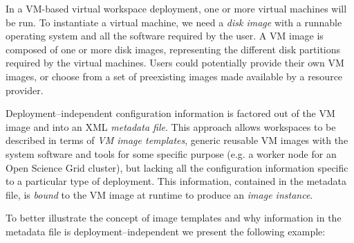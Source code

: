 In a VM-based virtual workspace deployment, one or more virtual machines will be run. To instantiate a virtual machine, we need a \emph{disk image} with a runnable operating system and all the software required by the user. A VM image is composed of one or more disk images, representing the different disk partitions required by the virtual machines. Users could potentially provide their own VM images, or choose from a set of preexisting images made available by a resource provider.

Deployment--independent configuration information is factored out of the VM image and into an XML \emph{metadata file}. This approach allows workspaces to be described in terms of \emph{VM image templates}, generic reusable VM images with the system software and tools for some specific purpose (e.g. a worker node for an Open Science Grid cluster), but lacking all the configuration information specific to a particular type of deployment. This information, contained in the metadata file, is \emph{bound} to the VM image at runtime to produce an \emph{image instance}.

To better illustrate the concept of image templates and why information in the metadata file is deployment--independent we present the following example:

